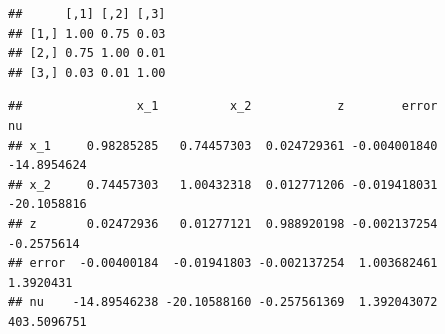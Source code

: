 \documentclass[
]{article}
\newenvironment{Shaded}{\begin{snugshade}}{\end{snugshade}}
\newcommand{\CommentTok}[1]{\textcolor[rgb]{0.56,0.35,0.01}{\textit{#1}}}
\newcommand{\DataTypeTok}[1]{\textcolor[rgb]{0.13,0.29,0.53}{#1}}
\newcommand{\DecValTok}[1]{\textcolor[rgb]{0.00,0.00,0.81}{#1}}
\newcommand{\KeywordTok}[1]{\textcolor[rgb]{0.13,0.29,0.53}{\textbf{#1}}}
\newcommand{\NormalTok}[1]{#1}
\newcommand{\OperatorTok}[1]{\textcolor[rgb]{0.81,0.36,0.00}{\textbf{#1}}}
\newcommand{\StringTok}[1]{\textcolor[rgb]{0.31,0.60,0.02}{#1}}
\begin{document}
\begin{verbatim}
##      [,1] [,2] [,3]
## [1,] 1.00 0.75 0.03
## [2,] 0.75 1.00 0.01
## [3,] 0.03 0.01 1.00
\end{verbatim}

\begin{Shaded}
\end{Shaded}

\begin{verbatim}
##                x_1          x_2            z        error          nu
## x_1     0.98285285   0.74457303  0.024729361 -0.004001840 -14.8954624
## x_2     0.74457303   1.00432318  0.012771206 -0.019418031 -20.1058816
## z       0.02472936   0.01277121  0.988920198 -0.002137254  -0.2575614
## error  -0.00400184  -0.01941803 -0.002137254  1.003682461   1.3920431
## nu    -14.89546238 -20.10588160 -0.257561369  1.392043072 403.5096751
\end{verbatim}

\begin{Shaded}
\end{Shaded}
\end{document}
